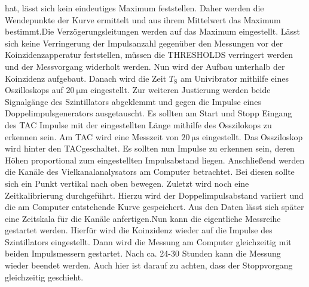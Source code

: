 hat, lässt sich kein eindeutiges Maximum feststellen. Daher werden die Wendepunkte der Kurve ermittelt und aus ihrem Mittelwert das Maximum bestimmt.Die Verzögerungsleitungen werden auf das Maximum eingestellt. Lässt sich keine Verringerung der Impulsanzahl gegenüber den Messungen vor der Koinzidenzapperatur feststellen, müssen die THRESHOLDS verringert werden und der Messvorgang widerholt werden. Nun wird der Aufbau unterhalb der Koinzidenz aufgebaut. Danach wird die Zeit $T_\text{S}$ am Univibrator mithilfe eines Oszilloskops auf $\SI{20}{\micro\meter}$ eingestellt. Zur weiteren Justierung werden beide Signalgänge des Szintillators abgeklemmt und gegen die Impulse eines Doppelimpulsgenerators ausgetauscht. Es sollten am Start und Stopp Eingang des TAC Impulse mit der eingestellten Länge mithilfe des Osszilokops zu erkennen sein. Am TAC wird eine Messzeit von $\SI{20}{\micro\second}$ eingestellt. Das Ossziloskop wird hinter den TACgeschaltet. Es sollten nun Impulse zu erkennen sein, deren Höhen proportional zum eingestellten Impulsabstand liegen. Anschließend werden die Kanäle des Vielkanalanalysators am Computer betrachtet. Bei diesen sollte sich ein Punkt vertikal nach oben bewegen. Zuletzt wird noch eine Zeitkalibrierung durchgeführt. Hierzu wird der Doppelimpulsabstand variiert und die am Computer entstehende Kurve gespeichert. Aus den Daten lässt sich später eine Zeitskala für die Kanäle anfertigen.Nun kann die eigentliche Messreihe gestartet werden. Hierfür wird die Koinzidenz wieder auf die Impulse des Szintillators eingestellt. Dann wird die Messung am Computer gleichzeitig mit beiden Impulsmessern gestartet. Nach ca. 24-30 Stunden kann die Messung wieder beendet werden. Auch hier ist darauf zu achten, dass der Stoppvorgang gleichzeitig geschieht.  